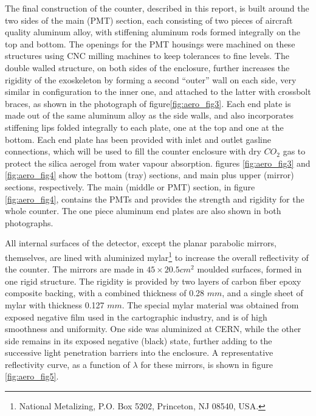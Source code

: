 The final construction of the counter, described in this report, is built
around the two sides of the main (PMT) section, each consisting of two pieces
of aircraft quality aluminum alloy, with stiffening aluminum rods formed
integrally on the top and bottom.  The openings for the PMT housings were
machined on these structures using CNC milling machines to keep tolerances to
fine levels.  The double walled structure, on both sides of the enclosure,
further increases the rigidity of the exoskeleton by forming a second ``outer''
wall on each side, very similar in configuration to the inner one, and attached
to the latter with crossbolt braces, as shown in the photograph of
figure\ref{fig:aero_fig3}.
Each end plate is made out of the same aluminum alloy as the side walls, and
also incorporates stiffening lips folded integrally to each plate, one at the
top and one at the bottom.  Each end plate has been provided with inlet and
outlet gasline connections, which will be used to fill the counter enclosure
with dry $CO_2$ gas to protect the silica aerogel from water vapour absorption.
figures \ref{fig:aero_fig3} and \ref{fig:aero_fig4} show the bottom (tray) sections, 
and main plus upper (mirror)
sections, respectively.  The main (middle or PMT) section, in
figure \ref{fig:aero_fig4},
contains the PMTs and provides the strength and rigidity for the whole counter.
The one piece aluminum end plates are also shown in both photographs. 

All internal surfaces of the detector, except the planar parabolic mirrors,
themselves, are lined with aluminized 
mylar\footnote{National Metalizing, P.O. Box 5202, Princeton, NJ 08540, USA.} 
to increase the
overall reflectivity of the counter.  The mirrors are made in $45\times 20.5 
cm^2$ moulded surfaces, formed in one rigid structure. The rigidity is provided
by two layers of carbon fiber epoxy composite backing, with a combined
thickness of 0.28 $mm$, and a single sheet of mylar with thickness 0.127 $mm$. 
The special mylar material was obtained from exposed negative film used in the
cartographic industry, and is of high smoothness and uniformity.   One side was
aluminized at CERN, while the other side remains in its exposed negative
(black) state, further adding to the successive light penetration barriers into
the enclosure.   A representative reflectivity curve, as a function of
$\lambda$ for these mirrors, is shown in figure \ref{fig:aero_fig5}. 
 

